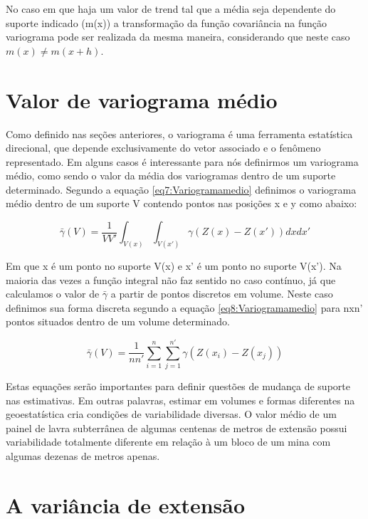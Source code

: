No caso em que haja um valor de trend tal que a média seja dependente do suporte indicado (m(x)) a transformação da função covariância na função variograma pode ser realizada da mesma maneira, considerando que neste caso $m(x) \neq m(x+h)$. 

\section{Valor de variograma médio}

Como definido nas seções anteriores, o variograma é uma ferramenta estatística direcional, que depende exclusivamente do vetor associado e o fenômeno representado. Em alguns casos é interessante para nós definirmos um variograma médio, como sendo o valor da média dos variogramas dentro de um suporte determinado. Segundo a equação \eqref{eq7:Variogramamedio} definimos o variograma médio dentro de um suporte V contendo pontos nas posições x e y como abaixo:

\begin{equation}\label{eq7:Variogramamedio}
\bar{\gamma } (V) =\frac{1}{VV'} \int_{V(x)} \int_{V(x')} \gamma (Z(x)-Z(x'))dx dx'
\end{equation}

Em que x é um ponto no suporte V(x) e x' é um ponto no suporte V(x'). Na maioria das vezes a função integral não faz sentido no caso contínuo, já que calculamos o valor de $ \bar{\gamma }$ a partir de pontos discretos em volume. Neste caso definimos sua forma discreta segundo a equação \eqref{eq8:Variogramamedio} para nxn' pontos situados dentro de um volume determinado.  

\begin{equation}\label{eq8:Variogramamedio}
\bar{\gamma } (V) = \frac{1}{n n'}\sum_{i=1}^{n}\sum_{j=1}^{n'} \gamma (Z(x_{i})-Z(x_{j}))
\end{equation}

Estas equações serão importantes para definir questões de mudança de suporte nas estimativas. Em outras palavras, estimar em volumes e formas diferentes na geoestatística cria condições de variabilidade diversas. O valor médio de um painel de lavra subterrânea de algumas centenas de metros de extensão possui variabilidade totalmente diferente em relação à um bloco de um mina com algumas dezenas de metros apenas. 

\section{A variância de extensão}

